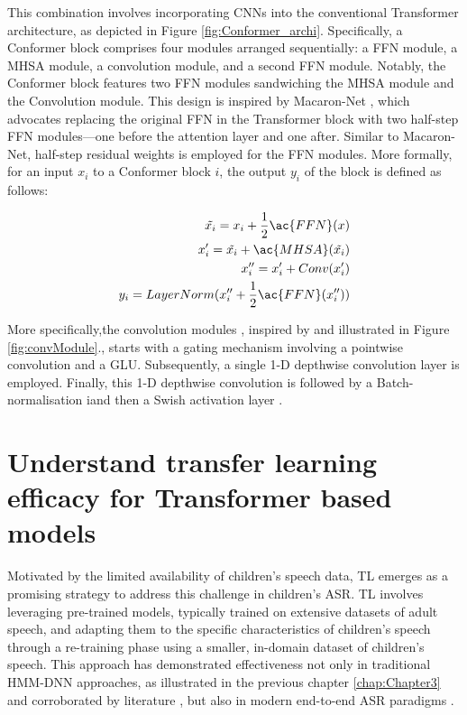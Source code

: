 This combination involves incorporating \acp{CNN} into the conventional Transformer architecture, as depicted in Figure \ref{fig:Conformer_archi}. Specifically, a Conformer block comprises four modules arranged sequentially: a \ac{FFN} module, a \ac{MHSA} module, a convolution module, and a second \ac{FFN} module. Notably, the Conformer block features two \ac{FFN} modules sandwiching the \ac{MHSA} module and the Convolution module. This design is inspired by Macaron-Net \cite{lu2019understanding}, which advocates replacing the original \ac{FFN} in the Transformer block with two half-step \ac{FFN} modules—one before the attention layer and one after. Similar to Macaron-Net, half-step residual weights is employed for the \ac{FFN} modules. More formally, for an input $x_i$ to a Conformer block $i$, the output $y_i$ of the block is defined as follows:


\begin{align}
    \begin{split}
    \tilde{x_i} = x_i + \frac{1}{2}\ac{FFN}(x) \\
    x_i^{\prime} =\tilde{x_i} + \ac{MHSA}(\tilde{x_i}) \\
    x_i^{\prime\prime} = x_i^{\prime} + Conv(x_i^{\prime}) \\
    y_i = LayerNorm(x_i^{\prime\prime} + \frac{1}{2}\ac{FFN}(x_i^{\prime\prime}))
    \end{split}
\end{align}

More specifically,the convolution modules , inspired by \cite{wu2020lite} and illustrated in Figure \ref{fig:convModule}., starts with a gating mechanism \cite{dauphin2017language} involving a pointwise convolution and a \ac{GLU}. Subsequently, a single 1-D depthwise convolution layer is employed. Finally, this 1-D depthwise convolution is followed by a Batch-normalisation iand then a Swish activation layer \cite{Prajit2017Searching}.


\section{Understand transfer learning efficacy for Transformer based models}
Motivated by the limited availability of children's speech data, \ac{TL} emerges as a promising strategy to address this challenge in children's \ac{ASR}. \ac{TL} involves leveraging pre-trained models, typically trained on extensive datasets of adult speech, and adapting them to the specific characteristics of children's speech through a re-training phase using a smaller, in-domain dataset of children's speech. This approach has demonstrated effectiveness not only in traditional \ac{HMM-DNN} approaches, as illustrated in the previous chapter \ref{chap:Chapter3} and corroborated by literature \cite{shivakumar2020transfer}, but also in modern end-to-end \ac{ASR} paradigms \cite{sri_end2end,gelin2021endtoend}.

